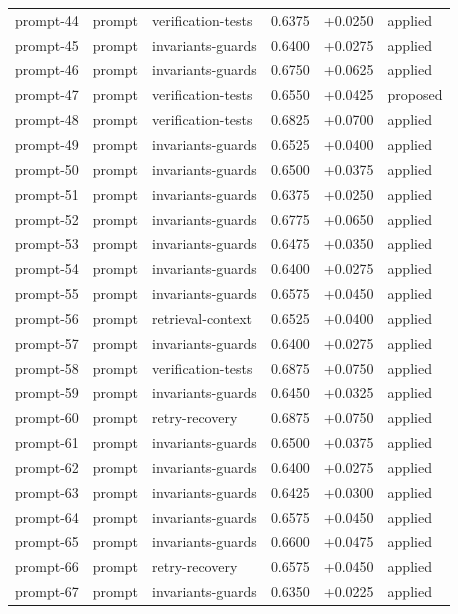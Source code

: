 \begin{center}
\begin{longtable}{llp{5.2cm}rrl}
prompt-44 & prompt & verification-tests & 0.6375 & +0.0250 & applied \\
prompt-45 & prompt & invariants-guards & 0.6400 & +0.0275 & applied \\
prompt-46 & prompt & invariants-guards & 0.6750 & +0.0625 & applied \\
prompt-47 & prompt & verification-tests & 0.6550 & +0.0425 & proposed \\
prompt-48 & prompt & verification-tests & 0.6825 & +0.0700 & applied \\
prompt-49 & prompt & invariants-guards & 0.6525 & +0.0400 & applied \\
prompt-50 & prompt & invariants-guards & 0.6500 & +0.0375 & applied \\
prompt-51 & prompt & invariants-guards & 0.6375 & +0.0250 & applied \\
prompt-52 & prompt & invariants-guards & 0.6775 & +0.0650 & applied \\
prompt-53 & prompt & invariants-guards & 0.6475 & +0.0350 & applied \\
prompt-54 & prompt & invariants-guards & 0.6400 & +0.0275 & applied \\
prompt-55 & prompt & invariants-guards & 0.6575 & +0.0450 & applied \\
prompt-56 & prompt & retrieval-context & 0.6525 & +0.0400 & applied \\
prompt-57 & prompt & invariants-guards & 0.6400 & +0.0275 & applied \\
prompt-58 & prompt & verification-tests & 0.6875 & +0.0750 & applied \\
prompt-59 & prompt & invariants-guards & 0.6450 & +0.0325 & applied \\
prompt-60 & prompt & retry-recovery & 0.6875 & +0.0750 & applied \\
prompt-61 & prompt & invariants-guards & 0.6500 & +0.0375 & applied \\
prompt-62 & prompt & invariants-guards & 0.6400 & +0.0275 & applied \\
prompt-63 & prompt & invariants-guards & 0.6425 & +0.0300 & applied \\
prompt-64 & prompt & invariants-guards & 0.6575 & +0.0450 & applied \\
prompt-65 & prompt & invariants-guards & 0.6600 & +0.0475 & applied \\
prompt-66 & prompt & retry-recovery & 0.6575 & +0.0450 & applied \\
prompt-67 & prompt & invariants-guards & 0.6350 & +0.0225 & applied \\

\end{longtable}
\end{center}
